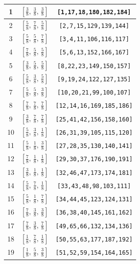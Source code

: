 \documentclass[fleqn,8pt]{jsarticle}
\begin{document}
\begin{longtable}{ccc}
1 & $\left[ \frac{3}{8},\, \frac{3}{8},\, \frac{3}{8} \right]$ & {\tt [1,17,18,180,182,184]} \\ \hline
2 & $\left[ \frac{5}{8},\, \frac{7}{8},\, \frac{5}{8} \right]$ & {\tt [2,7,15,129,139,144]} \\ \hline
3 & $\left[ \frac{5}{8},\, \frac{5}{8},\, \frac{7}{8} \right]$ & {\tt [3,4,11,106,116,117]} \\ \hline
4 & $\left[ \frac{7}{8},\, \frac{5}{8},\, \frac{5}{8} \right]$ & {\tt [5,6,13,152,166,167]} \\ \hline
5 & $\left[ \frac{3}{8},\, \frac{5}{8},\, \frac{5}{8} \right]$ & {\tt [8,22,23,149,150,157]} \\ \hline
6 & $\left[ \frac{5}{8},\, \frac{3}{8},\, \frac{5}{8} \right]$ & {\tt [9,19,24,122,127,135]} \\ \hline
7 & $\left[ \frac{5}{8},\, \frac{5}{8},\, \frac{3}{8} \right]$ & {\tt [10,20,21,99,100,107]} \\ \hline
8 & $\left[ \frac{7}{8},\, \frac{7}{8},\, \frac{7}{8} \right]$ & {\tt [12,14,16,169,185,186]} \\ \hline
9 & $\left[ \frac{3}{8},\, \frac{7}{8},\, \frac{7}{8} \right]$ & {\tt [25,41,42,156,158,160]} \\ \hline
10 & $\left[ \frac{5}{8},\, \frac{3}{8},\, \frac{1}{8} \right]$ & {\tt [26,31,39,105,115,120]} \\ \hline
11 & $\left[ \frac{5}{8},\, \frac{1}{8},\, \frac{3}{8} \right]$ & {\tt [27,28,35,130,140,141]} \\ \hline
12 & $\left[ \frac{7}{8},\, \frac{1}{8},\, \frac{1}{8} \right]$ & {\tt [29,30,37,176,190,191]} \\ \hline
13 & $\left[ \frac{3}{8},\, \frac{1}{8},\, \frac{1}{8} \right]$ & {\tt [32,46,47,173,174,181]} \\ \hline
14 & $\left[ \frac{5}{8},\, \frac{7}{8},\, \frac{1}{8} \right]$ & {\tt [33,43,48,98,103,111]} \\ \hline
15 & $\left[ \frac{5}{8},\, \frac{1}{8},\, \frac{7}{8} \right]$ & {\tt [34,44,45,123,124,131]} \\ \hline
16 & $\left[ \frac{7}{8},\, \frac{3}{8},\, \frac{3}{8} \right]$ & {\tt [36,38,40,145,161,162]} \\ \hline
17 & $\left[ \frac{7}{8},\, \frac{3}{8},\, \frac{7}{8} \right]$ & {\tt [49,65,66,132,134,136]} \\ \hline
18 & $\left[ \frac{1}{8},\, \frac{7}{8},\, \frac{1}{8} \right]$ & {\tt [50,55,63,177,187,192]} \\ \hline
19 & $\left[ \frac{1}{8},\, \frac{5}{8},\, \frac{3}{8} \right]$ & {\tt [51,52,59,154,164,165]} \\ \hline

\end{longtable}
\end{document}
